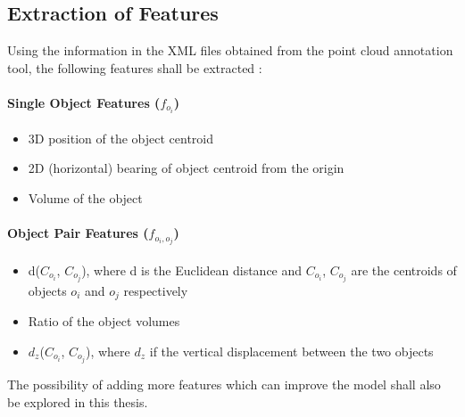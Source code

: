 \documentclass[12pt]{article}
\begin{document}
\subsection{Extraction of Features}

Using the information in the XML files obtained from the point cloud annotation tool, the following features shall be extracted \cite{STRANDS}:

\paragraph{Single Object Features ($f_{o_i}$)}

\begin{itemize}
\item{3D position of the object centroid}
\item{2D (horizontal) bearing of object centroid from the origin}
\item{Volume of the object}
\end{itemize}

\paragraph{Object Pair Features ($f_{o_i, o_j}$)}

\begin{itemize}
\item{d($C_{o_i}$, $C_{o_j}$), where d is the Euclidean distance and $C_{o_i}$, $C_{o_j}$ are the centroids of objects $o_i$ and $o_j$ respectively}
\item{Ratio of the object volumes}
\item{$d_z$($C_{o_i}$, $C_{o_j}$), where $d_z$ if the vertical displacement between the two objects}
\end{itemize}


The possibility of adding more features which can improve the model shall also be explored in this thesis.
\end{document}
